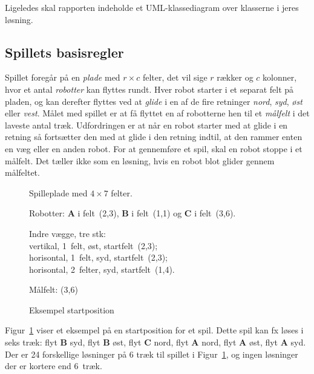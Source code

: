 Ligeledes skal rapporten indeholde et UML-klassediagram over klasserne i
jeres løsning.

\subsection*{Spillets basisregler}
\label{sec:spillets-basisregler}

Spillet foregår på en \emph{plade} med $r \times c$ felter, det vil
sige $r$ rækker og $c$ kolonner, hvor et antal
\emph{robotter} kan flyttes rundt. Hver robot starter i et separat felt på
pladen, og kan derefter flyttes ved at \emph{glide} i en af de fire
retninger \emph{nord}, \emph{syd}, \emph{øst} eller \emph{vest}. Målet
med spillet er at få flyttet en af robotterne hen til et
\emph{målfelt} i det laveste antal træk. Udfordringen er at når en
robot starter med at glide i en retning så fortsætter den med at glide
i den retning indtil, at den rammer enten en væg eller en anden
robot. For at gennemføre et spil, skal en robot stoppe i et
målfelt. Det tæller ikke som en løsning, hvis en robot blot glider
gennem målfeltet.

\begin{figure}
\hfill
\begin{minipage}[t]{0.4\linewidth}
  \raggedright\setlength{\parskip}{1ex}
  Spilleplade med $4\times 7$ felter.

  Robotter: \textbf{A} i felt~(2,3), \textbf{B} i felt~(1,1) og
  \textbf{C} i felt~(3,6).

  Indre vægge, tre stk: \\
  vertikal, 1~felt, øst, startfelt~(2,3); \\
  horisontal, 1~felt, syd, startfelt~(2,3); \\
  horisontal, 2~felter, syd, startfelt~(1,4).

  Målfelt: (3,6)
\end{minipage}
  \caption{Eksempel startposition}
  \label{fig:example}
\end{figure}

Figur~\ref{fig:example} viser et eksempel på en startposition for et
spil. Dette spil kan fx løses i seks træk: flyt \textbf{B} syd, flyt
\textbf{B} øst, flyt \textbf{C} nord, flyt \textbf{A} nord, flyt
\textbf{A} øst, flyt \textbf{A} syd. Der er 24 forskellige løsninger
på 6 træk til spillet i Figur~\ref{fig:example}, og ingen løsninger der er
kortere end 6~træk.

